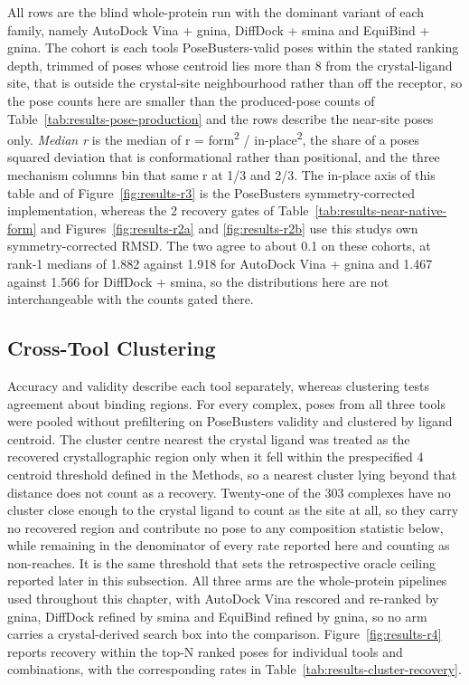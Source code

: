 \begin{landscape}
\begin{longtable}[]
{All rows are the blind whole-protein run with the dominant variant of each family, namely AutoDock Vina + gnina, DiffDock + smina and EquiBind + gnina. The cohort is each tool\textquotesingle s PoseBusters-valid poses within the stated ranking depth, trimmed of poses whose centroid lies more than 8\angstrom{} from the crystal-ligand site, that is outside the crystal-site neighbourhood rather than off the receptor, so the pose counts here are smaller than the produced-pose counts of Table~\ref{tab:results-pose-production} and the rows describe the near-site poses only. \emph{Median r} is the median of r = form\textsuperscript{2} / in-place\textsuperscript{2}, the share of a pose\textquotesingle s squared deviation that is conformational rather than positional, and the three mechanism columns bin that same r at 1/3 and 2/3. The in-place axis of this table and of Figure~\ref{fig:results-r3} is the PoseBusters symmetry-corrected implementation, whereas the 2\angstrom{} recovery gates of Table~\ref{tab:results-near-native-form} and Figures~\ref{fig:results-r2a} and \ref{fig:results-r2b} use this study\textquotesingle s own symmetry-corrected RMSD. The two agree to about 0.1\angstrom{} on these cohorts, at rank-1 medians of 1.882 against 1.918\angstrom{} for AutoDock Vina + gnina and 1.467 against 1.566\angstrom{} for DiffDock + smina, so the distributions here are not interchangeable with the counts gated there.} \\
\end{longtable}
\end{landscape}

\hypertarget{cross-tool-clustering}{%
\subsection{Cross-Tool Clustering}\label{cross-tool-clustering}}

Accuracy and validity describe each tool separately, whereas clustering tests agreement about binding regions. For every complex, poses from all three tools were pooled without prefiltering on PoseBusters validity and clustered by ligand centroid. The cluster centre nearest the crystal ligand was treated as the recovered crystallographic region only when it fell within the prespecified 4 \angstrom{} centroid threshold defined in the Methods, so a nearest cluster lying beyond that distance does not count as a recovery. Twenty-one of the 303 complexes have no cluster close enough to the crystal ligand to count as the site at all, so they carry no recovered region and contribute no pose to any composition statistic below, while remaining in the denominator of every rate reported here and counting as non-reaches. It is the same threshold that sets the retrospective oracle ceiling reported later in this subsection. All three arms are the whole-protein pipelines used throughout this chapter, with AutoDock Vina rescored and re-ranked by gnina, DiffDock refined by smina and EquiBind refined by gnina, so no arm carries a crystal-derived search box into the comparison. Figure~\ref{fig:results-r4} reports recovery within the top-N ranked poses for individual tools and combinations, with the corresponding rates in Table~\ref{tab:results-cluster-recovery}.

